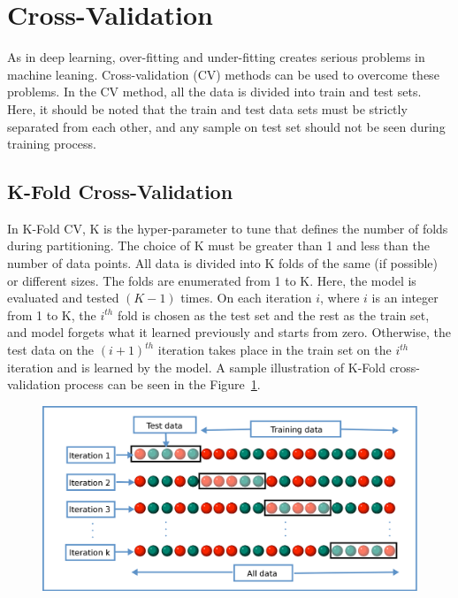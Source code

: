 \section{Cross-Validation}

As in deep learning, over-fitting and under-fitting creates serious problems in machine leaning. Cross-validation (CV) methods can be used to overcome these problems. In the CV method, all the data is divided into train and test sets. Here, it should be noted that the train and test data sets must be strictly separated from each other, and any sample on test set should not be seen during training process.

\subsection{K-Fold Cross-Validation}

In K-Fold CV, K is the hyper-parameter to tune that defines the number of folds during partitioning. The choice of K must be greater than 1 and less than the number of data points. All data is divided into K folds of the same (if possible) or different sizes. The folds are enumerated from 1 to K. Here, the model is evaluated and tested $(K-1)$ times. On each iteration $i$, where $i$ is an integer from 1 to K, the $i^{th}$ fold is chosen as the test set and the rest as the train set, and model forgets what it learned previously and starts from zero. Otherwise, the test data on the $(i+1)^{th}$ iteration takes place in the train set on the $i^{th}$ iteration and is learned by the model. A sample illustration of K-Fold cross-validation process can be seen in the Figure~\ref{k_fold_cv}.

\begin{figure}[h]
	\centering
	\includegraphics[width=.8\linewidth]{fig/k_fold_cv.png}
	\vspace*{2mm}
	\label{k_fold_cv}
\end{figure}


